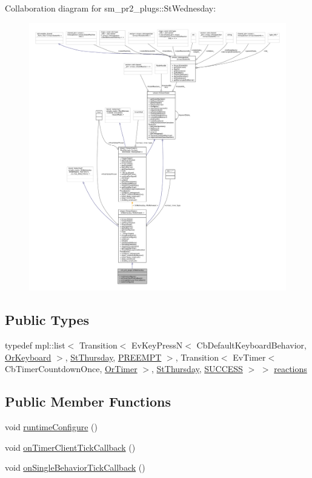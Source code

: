 Collaboration diagram for sm\+\_\+pr2\+\_\+plugs\+:\+:St\+Wednesday\+:
\nopagebreak
\begin{figure}[H]
\begin{center}
\leavevmode
\includegraphics[width=350pt]{structsm__pr2__plugs_1_1StWednesday__coll__graph}
\end{center}
\end{figure}
\subsection*{Public Types}
\begin{DoxyCompactItemize}
\item 
typedef mpl\+::list$<$ Transition$<$ Ev\+Key\+PressN$<$ Cb\+Default\+Keyboard\+Behavior, \hyperlink{classsm__pr2__plugs_1_1OrKeyboard}{Or\+Keyboard} $>$, \hyperlink{structsm__pr2__plugs_1_1StThursday}{St\+Thursday}, \hyperlink{classPREEMPT}{P\+R\+E\+E\+M\+PT} $>$, Transition$<$ Ev\+Timer$<$ Cb\+Timer\+Countdown\+Once, \hyperlink{classsm__pr2__plugs_1_1OrTimer}{Or\+Timer} $>$, \hyperlink{structsm__pr2__plugs_1_1StThursday}{St\+Thursday}, \hyperlink{classSUCCESS}{S\+U\+C\+C\+E\+SS} $>$ $>$ \hyperlink{structsm__pr2__plugs_1_1StWednesday_a36fe111ecdc29a99a855ef7fe089b4d5}{reactions}
\end{DoxyCompactItemize}
\subsection*{Public Member Functions}
\begin{DoxyCompactItemize}
\item 
void \hyperlink{structsm__pr2__plugs_1_1StWednesday_a1d5c3344199b6ce3483e6c28087c85cd}{runtime\+Configure} ()
\item 
void \hyperlink{structsm__pr2__plugs_1_1StWednesday_a24125d5c2aeac36e971eb174a0349596}{on\+Timer\+Client\+Tick\+Callback} ()
\item 
void \hyperlink{structsm__pr2__plugs_1_1StWednesday_a1591a4d648d628c865e2ad0a2605bfaa}{on\+Single\+Behavior\+Tick\+Callback} ()
\end{DoxyCompactItemize}

